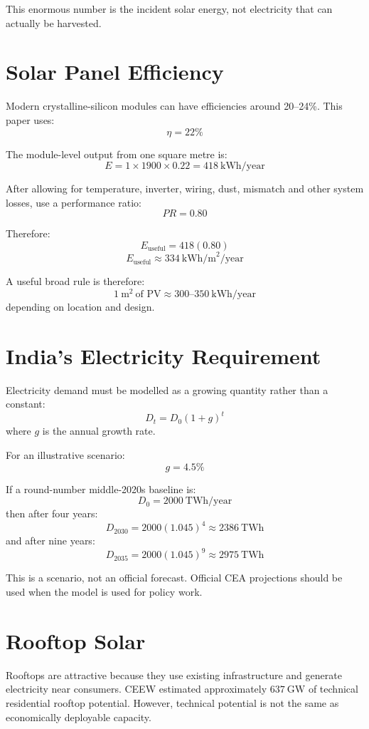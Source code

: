 \documentclass[11pt,a4paper]{article}
\begin{document}
This enormous number is the incident solar energy, not electricity that can actually be harvested.

\section{Solar Panel Efficiency}

Modern crystalline-silicon modules can have efficiencies around 20--24\%. This paper uses:
\[
\eta = 22\%
\]

The module-level output from one square metre is:
\[
E = 1 \times 1900 \times 0.22 = 418\ \text{kWh/year}
\]

After allowing for temperature, inverter, wiring, dust, mismatch and other system losses, use a performance ratio:
\[
PR = 0.80
\]

Therefore:
\[
E_{\text{useful}} = 418(0.80)
\]
\[
\boxed{E_{\text{useful}} \approx 334\ \text{kWh/m}^2/\text{year}}
\]

A useful broad rule is therefore:
\[
\boxed{1\ \text{m}^2\ \text{of PV} \approx 300\text{--}350\ \text{kWh/year}}
\]
depending on location and design.

\section{India's Electricity Requirement}

Electricity demand must be modelled as a growing quantity rather than a constant:
\[
D_t = D_0(1+g)^t
\]
where $g$ is the annual growth rate.

For an illustrative scenario:
\[
g = 4.5\%
\]

If a round-number middle-2020s baseline is:
\[
D_0 = 2000\ \text{TWh/year}
\]
then after four years:
\[
D_{2030} = 2000(1.045)^4 \approx 2386\ \text{TWh}
\]
and after nine years:
\[
D_{2035} = 2000(1.045)^9 \approx 2975\ \text{TWh}
\]

This is a scenario, not an official forecast. Official CEA projections should be used when the model is used for policy work.

\section{Rooftop Solar}

Rooftops are attractive because they use existing infrastructure and generate electricity near consumers. CEEW estimated approximately $637\ \text{GW}$ of technical residential rooftop potential. However, technical potential is not the same as economically deployable capacity.
\end{document}

